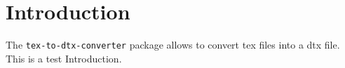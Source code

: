 \section{Introduction}

The \texttt{tex-to-dtx-converter} package allows to convert tex files into a dtx file. This is a test Introduction.

\clearpage
